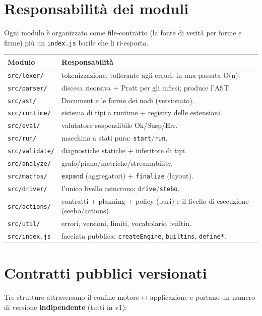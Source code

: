 \documentclass[11pt,a4paper]{book}
\let\code\lstinline
\newcommand{\ic}[1]{{\ttfamily #1}}
\theoremstyle{definition}
\begin{document}
{{{{\section{Responsabilità dei moduli}

Ogni modulo è organizzato come file-contratto (la fonte di verità per forme e
firme) più un \code|index.js| barile che li ri-esporta.

\begin{center}
\small
\begin{tabular}{@{}l p{9.2cm}@{}}
\toprule
\textbf{Modulo} & \textbf{Responsabilità} \\
\midrule
\code|src/lexer/| & tokenizzazione, tollerante agli errori, in una passata O(n). \\
\code|src/parser/| & discesa ricorsiva + Pratt per gli infissi; produce l'AST. \\
\code|src/ast/| & \ic{Document} e le forme dei nodi (versionato). \\
\code|src/runtime/| & sistema di tipi a runtime + registry delle estensioni. \\
\code|src/eval/| & valutatore sospendibile \ic{Ok/Susp/Err}. \\
\code|src/run/| & macchina a stati pura: \code|start|/\code|run|. \\
\code|src/validate/| & diagnostiche statiche + inferitore di tipi. \\
\code|src/analyze/| & grafo/piano/metriche/streamability. \\
\code|src/macros/| & \code|expand| (aggregatori) + \code|finalize| (layout). \\
\code|src/driver/| & l'unico livello asincrono; \code|drive|/\code|stebo|. \\
\code|src/actions/| & contratti + planning + policy (puri) e il livello di
esecuzione (\ic{seebo/actions}). \\
\code|src/util/| & errori, versioni, limiti, vocabolario builtin. \\
\code|src/index.js| & facciata pubblica: \code|createEngine|, \code|builtins|,
\code|define*|. \\
\bottomrule
\end{tabular}
\end{center}

\section{Contratti pubblici versionati}

Tre strutture attraversano il confine motore$\leftrightarrow$applicazione e portano
un numero di versione \textbf{indipendente} (tutti \ic{1} in v1):

}}}}
\end{document}
